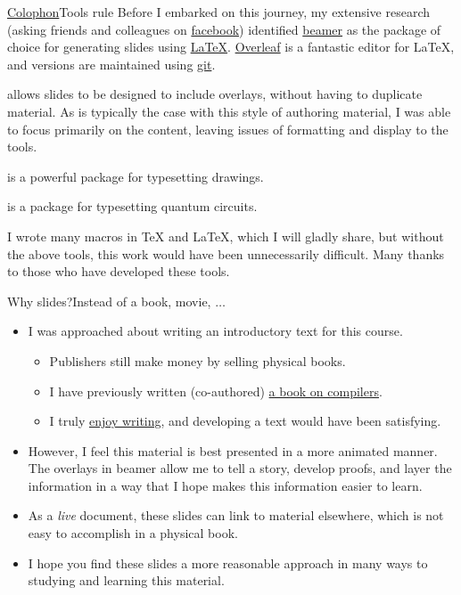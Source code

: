 \begin{frame}{\href{https://en.wikipedia.org/wiki/Colophon_(publishing)}{Colophon}}{Tools rule}
Before I embarked on this journey, my extensive research (asking friends and colleagues on \href{https://en.wikipedia.org/wiki/Facebook}{facebook}) identified \href{https://en.wikipedia.org/wiki/Beamer_(LaTeX)}{beamer} as the package of choice for generating slides using \href{https://en.wikibooks.org/wiki/LaTeX}{\LaTeX}.  \href{https://en.wikipedia.org/wiki/Overleaf}{Overleaf} is a fantastic editor for \LaTeX, and versions are maintained using \href{https://en.wikipedia.org/wiki/Git}{git}.

\begin{description}[<+->]
  \item[beamer] allows slides to be designed to include overlays, without having to duplicate material. As is typically the case with this style of authoring material, I was able to focus primarily on the content, leaving issues of formatting and display to the tools.
  \item[\href{https://en.wikibooks.org/wiki/LaTeX/PGF/TikZ}{tikz}] is a powerful package for typesetting drawings.
  \item[\href{https://ctan.org/pkg/quantikz?lang=en}{quantikz}] is a package for typesetting quantum circuits.
\end{description}
I wrote many macros in \TeX{} and \LaTeX{}, which I will gladly share, but without the above tools, this work would have been unnecessarily difficult.  Many thanks to those who have developed these tools.
\end{frame}

\begin{frame}{Why slides?}{Instead of a book, movie, $\ldots$}
\begin{itemize}
    \item I was approached about writing an introductory text for this course.
    \begin{itemize}
    \item Publishers still make money by selling physical books.
    \item I have previously written (co-authored) \href{https://www.amazon.com/Crafting-Compiler-Charles-N-Fischer/dp/0136067050}{a book on compilers}.
    \item I truly \href{https://www.cse.wustl.edu/~cytron/FAQ/writers.html}{enjoy writing}, and developing a text would have been satisfying.
    \end{itemize}
    \item However, I feel this material is best presented in a more animated manner.  The overlays in beamer allow me to tell a story, develop proofs, and layer the information in a way that I hope makes this information easier to learn.
    \item As a \emph{live} document, these slides can link to material elsewhere, which is not easy to accomplish in a physical book.
    \item I hope you find these slides a more reasonable approach in many ways to studying and learning this material.
\end{itemize}
\end{frame}


